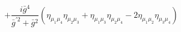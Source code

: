 %
\begin{dmath*}
%
  +  \frac{i {\bar g}{}^4}{{\bar g}^{\prime 2} + {\bar g}{}^2} \left(\eta_{\mu_1 \mu_4} \eta_{\mu_2 \mu_3} + \eta_{\mu_1 \mu_3} \eta_{\mu_2 \mu_4} - 2 \eta_{\mu_1 \mu_2} \eta_{\mu_3 \mu_4}\right)
%
\end{dmath*}
%
